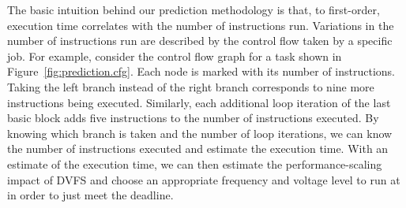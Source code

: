 The basic intuition behind our prediction methodology is that, to first-order,
execution time correlates with the number of instructions run. Variations in
the number of instructions run are described by the control flow taken by a
specific job. For example, consider the control flow graph for a task shown in
Figure~\ref{fig:prediction.cfg}. Each node is marked with its number of instructions.
Taking the left branch instead of the right
branch corresponds to nine more instructions being executed. Similarly, each
additional loop iteration of the last basic block adds five instructions to the
number of instructions executed. By knowing which branch is taken and the
number of loop iterations, we can know the number of instructions
executed and estimate the execution time. 
With an estimate of the execution time, we can then estimate the performance-scaling impact of DVFS and choose
an appropriate frequency and voltage level to run at in order to just
meet the deadline.

